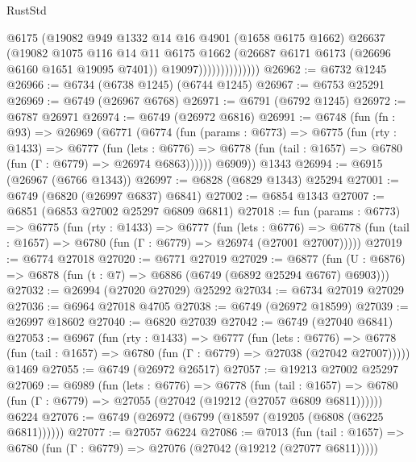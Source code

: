 \begin{lexlean}{RustStd}
\begin{coremodule}
                            @6175
                            (@19082
                              @949
                              @1332
                              @14
                              @16
                              @4901
                              (@1658 @6175 @1662)
                              @26637
                              (@19082
                                @1075
                                @116
                                @14
                                @11
                                @6175
                                @1662
                                (@26687 @6171 @6173 (@26696 @6160 @1651 @19095 @7401))
                                @19097))))))))))))))
@26962 := @6732 @1245
@26966 := @6734 (@6738 @1245) (@6744 @1245)
@26967 := @6753 @25291
@26969 := @6749 (@26967 @6768)
@26971 := @6791 (@6792 @1245)
@26972 := @6787 @26971
@26974 := @6749 (@26972 @6816)
@26991 := @6748
    (fun (fn : @93) =>
    @26969
      (@6771
        (@6774
          (fun (params : @6773) =>
          @6775
            (fun (rty : @1433) =>
            @6777
              (fun (lets : @6776) =>
              @6778 (fun (tail : @1657) => @6780 (fun (Γ : @6779) => @26974 @6863))))))
        @6909))
    @1343
@26994 := @6915 (@26967 (@6766 @1343))
@26997 := @6828 (@6829 @1343) @25294
@27001 := @6749 (@6820 (@26997 @6837) @6841)
@27002 := @6854 @1343
@27007 := @6851 (@6853 @27002 @25297 @6809 @6811)
@27018 := fun (params : @6773) =>
  @6775
    (fun (rty : @1433) =>
    @6777
      (fun (lets : @6776) =>
      @6778 (fun (tail : @1657) => @6780 (fun (Γ : @6779) => @26974 (@27001 @27007)))))
@27019 := @6774 @27018
@27020 := @6771 @27019
@27029 := @6877
    (fun (U : @6876) => @6878 (fun (t : @7) => @6886 (@6749 (@6892 @25294 @6767) @6903)))
@27032 := @26994 (@27020 @27029) @25292
@27034 := @6734 @27019 @27029
@27036 := @6964 @27018 @4705
@27038 := @6749 (@26972 @18599)
@27039 := @26997 @18602
@27040 := @6820 @27039
@27042 := @6749 (@27040 @6841)
@27053 := @6967
    (fun (rty : @1433) =>
    @6777
      (fun (lets : @6776) =>
      @6778 (fun (tail : @1657) => @6780 (fun (Γ : @6779) => @27038 (@27042 @27007)))))
    @1469
@27055 := @6749 (@26972 @26517)
@27057 := @19213 @27002 @25297
@27069 := @6989
    (fun (lets : @6776) =>
    @6778
      (fun (tail : @1657) =>
      @6780 (fun (Γ : @6779) => @27055 (@27042 (@19212 (@27057 @6809 @6811))))))
    @6224
@27076 := @6749 (@26972 (@6799 (@18597 (@19205 (@6808 (@6225 @6811))))))
@27077 := @27057 @6224
@27086 := @7013
    (fun (tail : @1657) => @6780 (fun (Γ : @6779) => @27076 (@27042 (@19212 (@27077 @6811)))))

\end{coremodule}
\end{lexlean}
